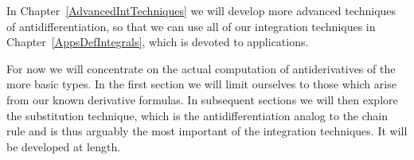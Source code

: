 In Chapter~\ref{AdvancedIntTechniques}
we will develop more advanced techniques of
antidifferentiation, so that we can use all of our integration
techniques in Chapter~\ref{AppsDefIntegrals}, which
is devoted to applications.

For now we will concentrate on the actual computation of
antiderivatives of the more basic types.
In the first section we will limit ourselves to those 
which arise from our known derivative formulas.  In subsequent
sections we will then explore the substitution technique, which
is the antidifferentiation analog to the chain rule
and is thus arguably the most important
of the integration techniques.  It will be developed at length.  





